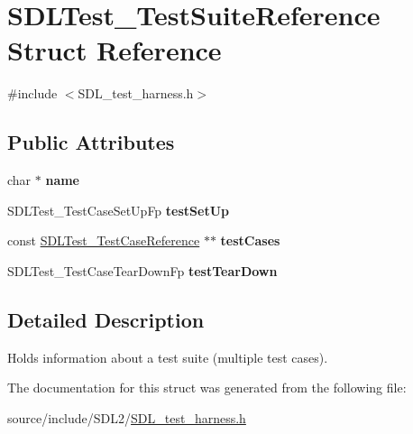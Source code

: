 \hypertarget{struct_s_d_l_test___test_suite_reference}{}\section{S\+D\+L\+Test\+\_\+\+Test\+Suite\+Reference Struct Reference}
\label{struct_s_d_l_test___test_suite_reference}


{\ttfamily \#include $<$S\+D\+L\+\_\+test\+\_\+harness.\+h$>$}

\subsection*{Public Attributes}
\begin{DoxyCompactItemize}
\item 
\hypertarget{struct_s_d_l_test___test_suite_reference_a8b002d932f91b321b384e59ae17f8f39}{}char $\ast$ {\bfseries name}\label{struct_s_d_l_test___test_suite_reference_a8b002d932f91b321b384e59ae17f8f39}

\item 
\hypertarget{struct_s_d_l_test___test_suite_reference_a8aa788b982efb93c93c2ab01202e0007}{}S\+D\+L\+Test\+\_\+\+Test\+Case\+Set\+Up\+Fp {\bfseries test\+Set\+Up}\label{struct_s_d_l_test___test_suite_reference_a8aa788b982efb93c93c2ab01202e0007}

\item 
\hypertarget{struct_s_d_l_test___test_suite_reference_a06d97ce5bcf9ceb1300cc4aa39c028d3}{}const \hyperlink{struct_s_d_l_test___test_case_reference}{S\+D\+L\+Test\+\_\+\+Test\+Case\+Reference} $\ast$$\ast$ {\bfseries test\+Cases}\label{struct_s_d_l_test___test_suite_reference_a06d97ce5bcf9ceb1300cc4aa39c028d3}

\item 
\hypertarget{struct_s_d_l_test___test_suite_reference_ad66abaf20653fd7361d28c69f88ac702}{}S\+D\+L\+Test\+\_\+\+Test\+Case\+Tear\+Down\+Fp {\bfseries test\+Tear\+Down}\label{struct_s_d_l_test___test_suite_reference_ad66abaf20653fd7361d28c69f88ac702}

\end{DoxyCompactItemize}


\subsection{Detailed Description}
Holds information about a test suite (multiple test cases). 

The documentation for this struct was generated from the following file\+:\begin{DoxyCompactItemize}
\item 
source/include/\+S\+D\+L2/\hyperlink{_s_d_l__test__harness_8h}{S\+D\+L\+\_\+test\+\_\+harness.\+h}\end{DoxyCompactItemize}
